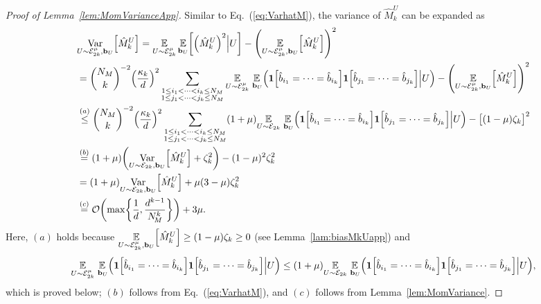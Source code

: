 \documentclass[aps,prl,twocolumn,nofootinbib,superscriptaddress,10pt]{revtex4-2}
\let\originalleft\left
\let\originalright\right
\renewcommand{\left}{\mathopen{}\mathclose\bgroup\originalleft}
\renewcommand{\right}{\aftergroup\egroup\originalright}
\def\E{ {\mathbb E} } %
\DeclareMathOperator{\Var}{Var}
\newcommand{\bigo}[1]{\mathcal{O}\left(#1\right)}
\theoremstyle{plain}
\theoremstyle{definition}
\newcommand{\eref}[1]{Eq.~\textup{(\ref{#1})}}
\newcommand{\lref}[1]{Lemma~\ref{#1}}
\begin{document}
\begin{proof}[Proof of \lref{lem:MomVarianceApp}]
Similar to \eref{eq:VarhatM}, 
the variance of $\hat{M}_k^{U}$ can be expanded as 
\begin{align}\label{eq:VarhatMapp} 
&\underset{U\sim \mathcal E_{2k}^\mu,  \mathbf{b}_{U}}{\Var} \left[ \hat{M}_k^{U}\right] 
= \underset{U\sim \mathcal E_{2k}^\mu}{\E} \,
\underset{\mathbf{b}_{U}}{\E}
\left[ \left( \hat{M}_k^{U}\right) ^2 \Big| U \right] 
- \left( \underset{U\sim \mathcal E_{2k}^\mu,  \mathbf{b}_{U}}{\E} \left[\hat{M}_k^{U}\right] \right)^2 
\nonumber\\
&= 
\binom{N_M}{k}^{-2} \left( \frac{\kappa_k}{d}\right)^2
\sum_{\substack{1\leq i_1<\dots<i_k\leq N_M \\ 1\leq j_1<\dots<j_k\leq N_M}} 
\underset{U\sim \mathcal E_{2k}^\mu}{\E} \, \underset{\,\mathbf{b}_{U}}{\E} \Big(
\textbf{1}\left[\hat{b}_{i_1}=\dots=\hat{b}_{i_k}\right]  
\textbf{1}\left[\hat{b}_{j_1}=\dots=\hat{b}_{j_k}\right]  \Big| U \Big) 
- \left( \underset{U\sim \mathcal E_{2k}^\mu,  \mathbf{b}_{U}}{\E} \left[\hat{M}_k^{U}\right] \right)^2 
\nonumber\\
&\stackrel{(a)}{\leq}  
\binom{N_M}{k}^{-2} \left( \frac{\kappa_k}{d}\right)^2
\sum_{\substack{1\leq i_1<\dots<i_k\leq N_M \\ 1\leq j_1<\dots<j_k\leq N_M}} 
(1+\mu) \underset{U\sim \mathcal E_{2k}}{\E} \, \underset{\,\mathbf{b}_{U}}{\E} \Big(
\textbf{1}\left[\hat{b}_{i_1}=\dots=\hat{b}_{i_k}\right]  
\textbf{1}\left[\hat{b}_{j_1}=\dots=\hat{b}_{j_k}\right]  \Big| U \Big) 
- \big[ (1-\mu)\zeta_k\big]^2
\nonumber\\
&\stackrel{(b)}{=} 
(1+\mu) \left(\underset{U\sim \mathcal E_{2k},\mathbf{b}_{U}}{\Var} \left[ \hat{M}_k^{U}\right] + \zeta_k^2\right)
- (1-\mu)^2\zeta_k^2
\nonumber\\
&= 
(1+\mu)  \underset{U\sim \mathcal E_{2k},\mathbf{b}_{U}}{\Var} \left[ \hat{M}_k^{U}\right] + \mu(3-\mu)\zeta_k^2
\nonumber\\
&\stackrel{(c)}{=}
\bigo{\max\left\lbrace \frac{1}{d} ,\frac{d^{k-1}}{N_{\!M}^{k}} \right\rbrace } +3\mu. 
\end{align}
Here, $(a)$ holds because $\underset{U\sim \mathcal E_{2k}^\mu,\mathbf{b}_{U}}{\E} \left[\hat{M}_k^{U}\right]\geq (1-\mu)\zeta_k\geq 0$ (see \lref{lam:biasMkUapp}) and 
\begin{align}\label{eq:EE11UB}
\underset{U\sim \mathcal E_{2k}^{\mu}}{\E} \, \underset{\,\mathbf{b}_{U}}{\E} \Big(
\textbf{1}\left[\hat{b}_{i_1}=\dots=\hat{b}_{i_k}\right]  
\textbf{1}\left[\hat{b}_{j_1}=\dots=\hat{b}_{j_k}\right]  \Big| U \Big) 
\leq 
(1+\mu) \underset{U\sim \mathcal E_{2k}}{\E} \, \underset{\,\mathbf{b}_{U}}{\E} \Big(
\textbf{1}\left[\hat{b}_{i_1}=\dots=\hat{b}_{i_k}\right]  
\textbf{1}\left[\hat{b}_{j_1}=\dots=\hat{b}_{j_k}\right]  \Big| U \Big),
\end{align}	
which is proved below; $(b)$ follows from \eref{eq:VarhatM}, and $(c)$ follows from \lref{lem:MomVariance}. 


\end{proof}
\end{document}
